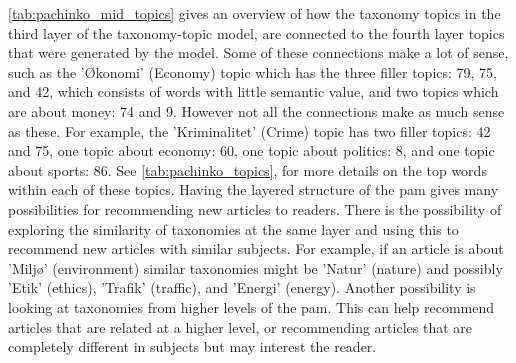 \autoref{tab:pachinko_mid_topics} gives an overview of how the taxonomy topics in the third layer of the taxonomy-topic model, are connected to the fourth layer topics that were generated by the model.
Some of these connections make a lot of sense, such as the 'Økonomi' (Economy) topic which has the three filler topics: 79, 75, and 42, which consists of words with little semantic value, and two topics which are about money: 74 and 9.
However not all the connections make as much sense as these. 
For example, the 'Kriminalitet' (Crime) topic has two filler topics: 42 and 75, one topic about economy: 60, one topic about politics: 8, and one topic about sports: 86.
See \autoref{tab:pachinko_topics}, for more details on the top words within each of these topics.
Having the layered structure of the \gls{pam} gives many possibilities for recommending new articles to readers.
There is the possibility of exploring the similarity of taxonomies at the same layer and using this to recommend new articles with similar subjects.
For example, if an article is about 'Miljø' (environment) similar taxonomies might be 'Natur' (nature) and possibly 'Etik' (ethics), 'Trafik' (traffic), and 'Energi' (energy).
Another possibility is looking at taxonomies from higher levels of the \gls{pam}.
This can help recommend articles that are related at a higher level, or recommending articles that are completely different in subjects but may interest the reader.

